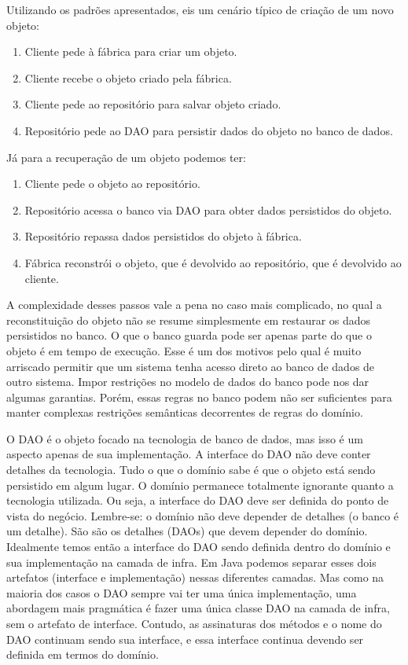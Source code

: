 \documentclass[a4paper, 12pt]{article}
\begin{document}
Utilizando os padrões apresentados, eis um cenário típico de criação de um novo objeto:

\begin{enumerate}
\item Cliente pede à fábrica para criar um objeto.
\item Cliente recebe o objeto criado pela fábrica.
\item Cliente pede ao repositório para salvar objeto criado.
\item Repositório pede ao DAO para persistir dados do objeto no banco de dados.
\end{enumerate}

Já para a recuperação de um objeto podemos ter:

\begin{enumerate}
\item Cliente pede o objeto ao repositório.
\item Repositório acessa o banco via DAO para obter dados persistidos do objeto.
\item Repositório repassa dados persistidos do objeto à fábrica.
\item Fábrica reconstrói o objeto, que é devolvido ao repositório, que é devolvido ao cliente.
\end{enumerate}

A complexidade desses passos vale a pena no caso mais complicado, no qual a reconstituição do objeto não se resume simplesmente em restaurar os dados persistidos no banco. O que o banco guarda pode ser apenas parte do que o objeto é em tempo de execução. Esse é um dos motivos pelo qual é muito arriscado permitir que um sistema tenha acesso direto ao banco de dados de outro sistema. Impor restrições no modelo de dados do banco pode nos dar algumas garantias. Porém, essas regras no banco podem não ser suficientes para manter complexas restrições semânticas decorrentes de regras do domínio.

O DAO é o objeto focado na tecnologia de banco de dados, mas isso é um aspecto apenas de sua implementação. A interface do DAO não deve conter detalhes da tecnologia. Tudo o que o domínio sabe é que o objeto está sendo persistido em algum lugar. O domínio permanece totalmente ignorante quanto a tecnologia utilizada. Ou seja, a interface do DAO deve ser definida do ponto de vista do negócio. Lembre-se: o domínio não deve depender de detalhes (o banco é um detalhe). São são os detalhes (DAOs) que devem depender do domínio. Idealmente temos então a interface do DAO sendo definida dentro do domínio e sua implementação na camada de infra. Em Java podemos separar esses dois artefatos (interface e implementação) nessas diferentes camadas. Mas como na maioria dos casos o DAO sempre vai ter uma única implementação, uma abordagem mais pragmática é fazer uma única classe DAO na camada de infra, sem o artefato de interface. Contudo, as assinaturas dos métodos e o nome do DAO continuam sendo sua interface, e essa interface continua devendo ser definida em termos do domínio.
\end{document}
